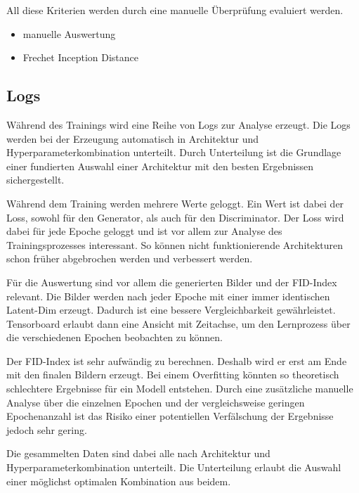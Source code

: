 All diese Kriterien werden durch eine manuelle Überprüfung evaluiert werden.

\begin{itemize}
	\item manuelle Auswertung
	\item Frechet Inception Distance \cite{frechet-inception-distance}
\end{itemize}

\subsection{Logs}
Während des Trainings wird eine Reihe von Logs zur Analyse erzeugt.
Die Logs werden bei der Erzeugung automatisch in Architektur und Hyperparameterkombination unterteilt.
Durch Unterteilung ist die Grundlage einer fundierten Auswahl einer Architektur mit den besten Ergebnissen sichergestellt.
\newline

Während dem Training werden mehrere Werte geloggt.
Ein Wert ist dabei der Loss, sowohl für den Generator, als auch für den Discriminator.
Der Loss wird dabei für jede Epoche geloggt und ist vor allem zur Analyse des Trainingsprozesses interessant.
So können nicht funktionierende Architekturen schon früher abgebrochen werden und verbessert werden.
\newline

Für die Auswertung sind vor allem die generierten Bilder und der FID-Index relevant.
Die Bilder werden nach jeder Epoche mit einer immer identischen Latent-Dim erzeugt.
Dadurch ist eine bessere Vergleichbarkeit gewährleistet.
Tensorboard erlaubt dann eine Ansicht mit Zeitachse, um den Lernprozess über die verschiedenen Epochen beobachten zu können.
\newline

Der FID-Index ist sehr aufwändig zu berechnen.
Deshalb wird er erst am Ende mit den finalen Bildern erzeugt.
Bei einem Overfitting könnten so theoretisch schlechtere Ergebnisse für ein Modell entstehen.
Durch eine zusätzliche manuelle Analyse über die einzelnen Epochen und der vergleichsweise geringen Epochenanzahl ist das Risiko einer potentiellen Verfälschung der Ergebnisse jedoch sehr gering.
\newline

Die gesammelten Daten sind dabei alle nach Architektur und Hyperparameterkombination unterteilt.
Die Unterteilung erlaubt die Auswahl einer möglichst optimalen Kombination aus beidem.


